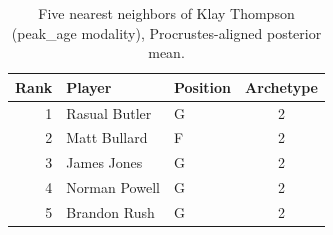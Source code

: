 \begin{table}[htbp]
  \centering\small
  \begin{tabular}{rllc}
    \toprule
    Rank & Player & Position & Archetype \\
    \midrule
    1 & Rasual Butler & G & 2 \\
    2 & Matt Bullard & F & 2 \\
    3 & James Jones & G & 2 \\
    4 & Norman Powell & G & 2 \\
    5 & Brandon Rush & G & 2 \\
    \bottomrule
  \end{tabular}
  \caption{Five nearest neighbors of Klay Thompson (peak_age modality), Procrustes-aligned posterior mean.}
  \label{tab:Klay_Thompson_neighbors_peak_age}
\end{table}

